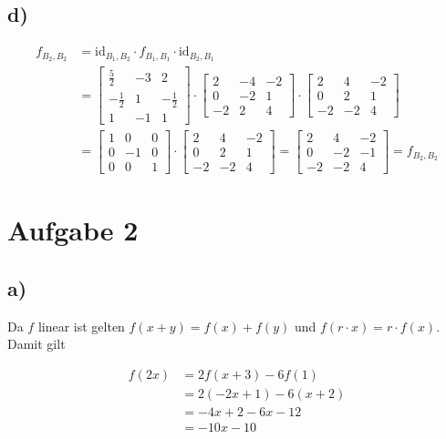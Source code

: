 \documentclass[a4paper, 11pt]{article}
\begin{document}
\subsection{d)}
\label{sec:org3b23af9}
\begin{align*}
f_{B_2,B_2} &= \text{id}_{B_1, B_2} \cdot f_{B_1,B_1} \cdot \text{id}_{B_2, B_1} \\
&= \begin{bmatrix} \frac{5}{2} & -3 & 2 \\ -\frac{1}{2} & 1 & -\frac{1}{2} \\ 1 & -1 & 1 \end{bmatrix} \cdot \begin{bmatrix} 2 & -4 & -2 \\ 0 & -2 & 1 \\ -2 & 2 & 4 \end{bmatrix} \cdot \begin{bmatrix} 2 & 4 & -2 \\ 0 & 2 & 1 \\ -2 & -2 & 4 \end{bmatrix} \\
&= \begin{bmatrix} 1 & 0 & 0 \\ 0 & -1 & 0 \\ 0 & 0 & 1 \end{bmatrix} \cdot
\begin{bmatrix} 2 & 4 & -2 \\ 0 & 2 & 1 \\ -2 & -2 & 4 \end{bmatrix}
= \begin{bmatrix} 2 & 4 & -2 \\ 0 & -2 & -1 \\ -2 & -2 & 4 \end{bmatrix}
= f_{B_2,B_2}
\end{align*}

\section{Aufgabe 2}
\label{sec:org23aaed3}
\subsection{a)}
\label{sec:org99edcaa}
Da \(f\) linear ist gelten \(f(x+y) = f(x) + f(y)\) und
\(f(r \cdot x) = r \cdot f(x)\). Damit gilt

\begin{align*}
    f(2x) &= 2f(x + 3) - 6 f(1) \\
    &= 2(-2x + 1) - 6(x + 2) \\
    &= -4x + 2 - 6x - 12 \\
    &= -10x - 10
\end{align*}
\end{document}
